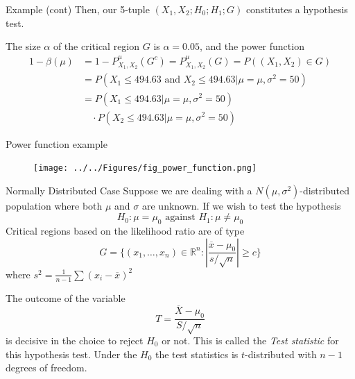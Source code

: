 \documentclass{beamer}
\begin{document}
\begin{frame}{Example (cont)}
	Then, our 5-tuple $(X_1,X_2;H_0;H_1;G)$ constitutes a hypothesis test. 
	
	The size $\alpha$ of the critical region $G$ is $\alpha=0.05$, and the power function
	\begin{equation*}
		\begin{split}
			1-\beta(\mu)&= 1-P^\mu_{X_1,X_2}(G^c)= P^\mu_{X_1,X_2}(G)= P((X_1,X_2)\in G)\\
			&=P(X_1 \le 494.63 \text{ and } X_2 \le 494.63| \mu=\mu, \sigma^2=50) \\
			&=P(X_1 \le 494.63 | \mu=\mu, \sigma^2=50)\\
			&\quad  \cdot P(X_2\le 494.63 | \mu=\mu, \sigma^2=50) 
		\end{split}
	\end{equation*}
\end{frame}

\begin{frame}{Power function example}
	\begin{figure}[h]
	\centering
	\texttt{[image: ../../Figures/fig\_power\_function.png]}
\end{figure}	
\end{frame}

\begin{frame}{Normally Distributed Case}
	Suppose we are dealing with a $N(\mu,\sigma^2)$-distributed population where both $\mu$ and $\sigma$ are unknown. If we wish to test the hypothesis
	\begin{equation*}
		H_0 \colon \mu=\mu_0 \text{ against } H_1 \colon \mu\ne \mu_0
	\end{equation*}
	Critical regions based on the likelihood ratio are of type
	\begin{equation*}
		G= \{(x_1,\ldots, x_n)\in \mathbb{R}^n : \left| \frac{\overline{x}-\mu_0}{s/\sqrt{n}} \right| \ge c\}
	\end{equation*}
	where $s^2= \frac{1}{n-1}\sum (x_i -\overline{x})^2$

	The outcome of the variable 
	\begin{equation*}
		T= \frac{\overline{X}-\mu_0}{S/\sqrt{n}}
	\end{equation*}
	is decisive in the choice to reject $H_0$ or not. This is called the \textit{Test statistic} for this hypothesis test. Under the $H_0$ the test statistics is $t$-distributed with $n-1$ degrees of freedom.
\end{frame}
\end{document}

